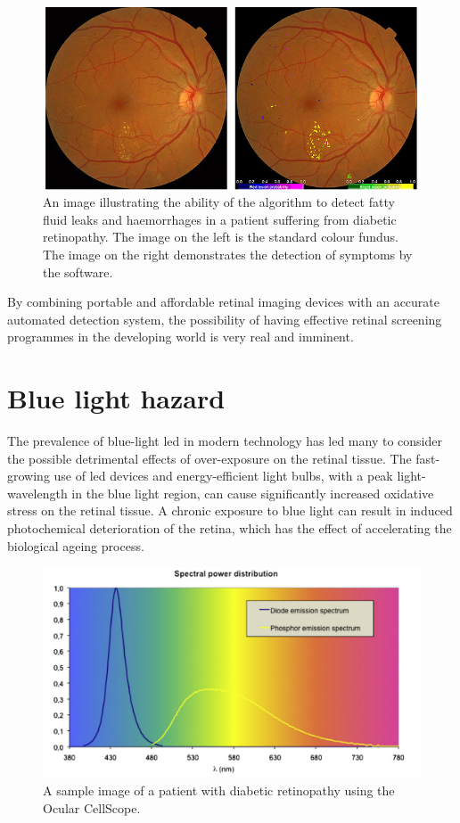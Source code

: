 \begin{figure}[H]
\centering
\includegraphics{figures/autodr}
\caption{An image illustrating the ability of the algorithm to detect fatty fluid leaks
and haemorrhages in a patient suffering from diabetic retinopathy. The image on the left
is the standard colour fundus. The image on the right demonstrates the detection of
symptoms by the software.\cite{sanchez2011evaluation}}
\label{fig:autodr}
\end{figure}

By combining portable and affordable retinal imaging devices with an accurate automated
detection system, the possibility of having effective retinal screening programmes in the
developing world is very real and imminent.


\section{Blue light hazard}

The prevalence of blue-light \Gls{led} in modern technology has led many to consider
the possible detrimental effects of over-exposure on the retinal tissue. The
fast-growing use of \Gls{led} devices and energy-efficient light bulbs, with a peak
light-wavelength in the blue light region, can cause significantly increased oxidative
stress on the retinal tissue.\cite{shang_wang} A chronic exposure to blue light can
result in induced photochemical deterioration of the retina, which has the effect of
accelerating the biological ageing process.\cite{behar_cohen_2011}

\begin{figure}[H]
\centering
\includegraphics[width=12cm]{figures/bluehazard}
\caption{A sample image of a patient with diabetic retinopathy using the Ocular CellScope.\cite{behar_cohen_2011}}
\label{fig:bluehaz}
\end{figure}


